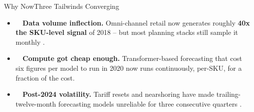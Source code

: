 \begin{frame}{Why Now}{Three Tailwinds Converging}

  \begin{itemize}
    \item \textcolor{accentMint}{\faChartLine}\ \ \textbf{Data volume inflection.} Omni-channel
      retail now generates roughly \textbf{40x the SKU-level signal} of 2018 -- but most
      planning stacks still sample it monthly \cite{nexa2025forecasting}.
    \item \textcolor{accentMint}{\faBolt}\ \ \textbf{Compute got cheap enough.} Transformer-based
      forecasting that cost six figures per model to run in 2020 now runs continuously,
      per-SKU, for a fraction of the cost.
    \item \textcolor{accentMint}{\faGlobe}\ \ \textbf{Post-2024 volatility.} Tariff resets and
      nearshoring have made trailing-twelve-month forecasting models unreliable for three
      consecutive quarters \cite{meridian2026supplychain}.
  \end{itemize}

  \vspace{0.5cm}

  \begin{minipage}[t]{0.31\textwidth}
    \begin{statcard}
    \end{statcard}
  \end{minipage}\hfill
  \begin{minipage}[t]{0.31\textwidth}
    \begin{statcard}
    \end{statcard}
  \end{minipage}\hfill
  \begin{minipage}[t]{0.31\textwidth}
    \begin{statcard}
    \end{statcard}
  \end{minipage}
  \par

\end{frame}
